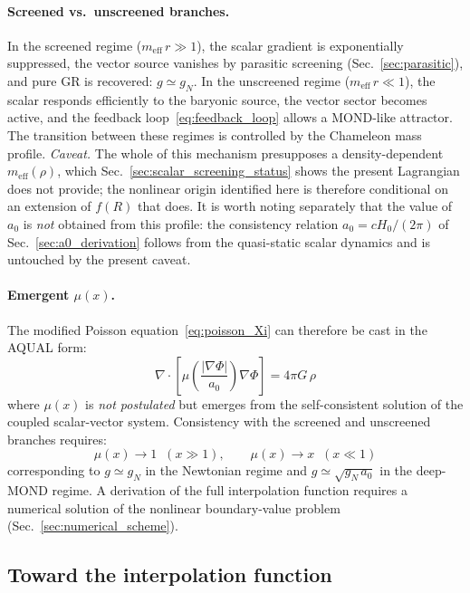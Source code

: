 \documentclass[aps,prd,twocolumn,superscriptaddress,nofootinbib]{revtex4-2}
\begin{document}
\paragraph{Screened vs.\ unscreened branches.}
In the screened regime ($m_{\mathrm{eff}}\,r \gg 1$), the scalar gradient is exponentially suppressed, the vector source vanishes by parasitic screening (Sec.~\ref{sec:parasitic}), and pure GR is recovered: $g \simeq g_N$. In the unscreened regime ($m_{\mathrm{eff}}\,r \ll 1$), the scalar responds efficiently to the baryonic source, the vector sector becomes active, and the feedback loop~\eqref{eq:feedback_loop} allows a MOND-like attractor. The transition between these regimes is controlled by the Chameleon mass profile. \textit{Caveat.} The whole of this mechanism presupposes a density-dependent $m_{\mathrm{eff}}(\rho)$, which Sec.~\ref{sec:scalar_screening_status} shows the present Lagrangian does not provide; the nonlinear origin identified here is therefore conditional on an extension of $f(R)$ that does. It is worth noting separately that the value of $a_0$ is \textit{not} obtained from this profile: the consistency relation $a_0 = cH_0/(2\pi)$ of Sec.~\ref{sec:a0_derivation} follows from the quasi-static scalar dynamics and is untouched by the present caveat.

\paragraph{Emergent $\mu(x)$.}
The modified Poisson equation~\eqref{eq:poisson_Xi} can therefore be cast in the AQUAL form:
\begin{equation}
\nabla\!\cdot\!\left[\mu\!\left(\frac{|\nabla\Phi|}{a_0}\right)\nabla\Phi\right] = 4\pi G\,\rho
\label{eq:aqual_emergent}
\end{equation}
where $\mu(x)$ is \textit{not postulated} but emerges from the self-consistent solution of the coupled scalar-vector system. Consistency with the screened and unscreened branches requires:
\begin{equation}
\mu(x) \to 1 \;\;(x \gg 1), \qquad \mu(x) \to x \;\;(x \ll 1)
\label{eq:mu_limits}
\end{equation}
corresponding to $g \simeq g_N$ in the Newtonian regime and $g \simeq \sqrt{g_N\,a_0}$ in the deep-MOND regime. A derivation of the full interpolation function requires a numerical solution of the nonlinear boundary-value problem (Sec.~\ref{sec:numerical_scheme}).

\subsection{Toward the interpolation function}
\label{sec:interpolation}
\end{document}
